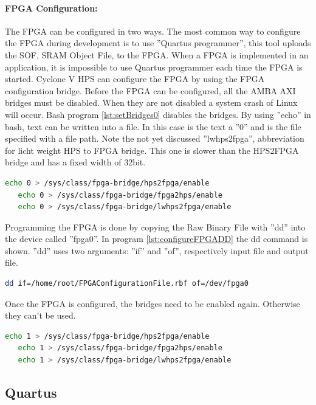 \documentclass[12pt,a4paper,english,twoside,openright]{tutthesis}
\begin{document}
			\paragraph{FPGA Configuration:	}
The FPGA can be configured in two ways. The most common way to configure the FPGA during development is to use ''Quartus programmer'', this tool uploads the SOF, SRAM Object File, to the FPGA. When a FPGA is implemented in an application, it is impossible to use Quartus programmer each time the FPGA is started. Cyclone V HPS can configure the FPGA by using the FPGA configuration bridge. Before the FPGA can be configured, all the AMBA AXI bridges must be disabled. When they are not disabled a system crash of Linux will occur. Bash program \ref{lst:setBridges0} disables the bridges. By using ''echo'' in bash, text can be written into a file. In this case is the text a ''0'' and is the file specified with a file path. Note the not yet discussed ''lwhps2fpga'', abbreviation for licht weight HPS to FPGA bridge. This one is slower than the HPS2FPGA bridge and has a fixed width of 32bit.
\begin{lstlisting}[caption={Disable the AMBA AXI bridges from HPS},label={lst:setBridges0},language=bash, float=h]
   echo 0 > /sys/class/fpga-bridge/hps2fpga/enable
   echo 0 > /sys/class/fpga-bridge/fpga2hps/enable
   echo 0 > /sys/class/fpga-bridge/lwhps2fpga/enable
\end{lstlisting}
Programming the FPGA is done by copying the Raw Binary File with ''dd'' into the device called ''fpga0''. In program \ref{lst:configureFPGADD} the dd command is shown. ''dd'' uses two arguments: ''if'' and ''of'', respectively input file and output file.
\begin{lstlisting}[caption={Configuration of the FPGA with Linux dd command},label={lst:configureFPGADD},language=bash, float=h]
   dd if=/home/root/FPGAConfigurationFile.rbf of=/dev/fpga0
\end{lstlisting}
Once the FPGA is configured, the bridges need to be enabled again. Otherwise they can't be used.
\begin{lstlisting}[caption={Enable the AMBA AXI bridges from HPS},label={lst:setBridges1},language=bash, float=h]
   echo 1 > /sys/class/fpga-bridge/hps2fpga/enable
   echo 1 > /sys/class/fpga-bridge/fpga2hps/enable
   echo 1 > /sys/class/fpga-bridge/lwhps2fpga/enable
\end{lstlisting}
		\subsection{Quartus}
\end{document}
